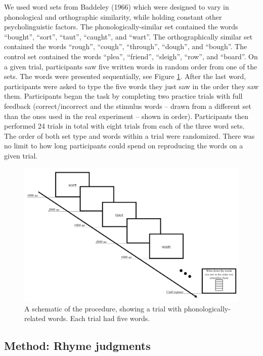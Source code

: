 \documentclass[
  man,a4paper,floatsintext]{apa6}
\begin{document}
We used word sets from Baddeley (1966) which were designed to vary in phonological and orthographic similarity, while holding constant other psycholinguistic factors. The phonologically-similar set contained the words ``bought'', ``sort'', ``taut'', ``caught'', and ``wart''. The orthographically similar set contained the words ``rough'', ``cough'', ``through'', ``dough'', and ``bough''. The control set contained the words ``plea'', ``friend'', ``sleigh'', ``row'', and ``board''. On a given trial, participants saw five written words in random order from one of the sets. The words were presented sequentially, see Figure \ref{fig:verbwm-procedure}. After the last word, participants were asked to type the five words they just saw in the order they saw them. Participants began the task by completing two practice trials with full feedback (correct/incorrect and the stimulus words -- drawn from a different set than the ones used in the real experiment -- shown in order). Participants then performed 24 trials in total with eight trials from each of the three word sets. The order of both set type and words within a trial were randomized. There was no limit to how long participants could spend on reproducing the words on a given trial.

\newpage

\begin{figure}[!ht]
\includegraphics[width=1\linewidth]{../figures/verbwm} \caption{A schematic of the procedure, showing a trial with phonologically-related words. Each trial had five words.}\label{fig:verbwm-procedure}
\end{figure}

\hypertarget{method-rhyme-judgments}{%
\subsection{Method: Rhyme judgments}\label{method-rhyme-judgments}}
\end{document}
